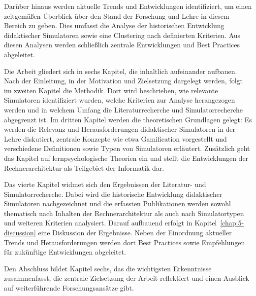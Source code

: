 Darüber hinaus werden aktuelle Trends und Entwicklungen identifiziert, um einen zeitgemäßen Überblick über den Stand der Forschung und Lehre in diesem Bereich zu geben. Dies umfasst die Analyse der historischen Entwicklung didaktischer Simulatoren sowie eine Clustering nach definierten Kriterien. Aus diesen Analysen werden schließlich zentrale Entwicklungen und Best Practices abgeleitet.

Die Arbeit gliedert sich in sechs Kapitel, die inhaltlich aufeinander aufbauen. Nach der Einleitung, in der Motivation und Zielsetzung dargelegt werden, folgt im zweiten Kapitel die Methodik. Dort wird beschrieben, wie relevante Simulatoren identifiziert wurden, welche Kriterien zur Analyse herangezogen werden und in welchem Umfang die Literaturrecherche und Simulatorrecherche abgegrenzt ist. Im dritten Kapitel werden die theoretischen Grundlagen gelegt: Es werden die Relevanz und Herausforderungen didaktischer Simulatoren in der Lehre diskutiert, zentrale Konzepte wie etwa Gamification vorgestellt und verschiedene Definitionen sowie Typen von Simulatoren erläutert. Zusätzlich geht das Kapitel auf lernpsychologische Theorien ein und stellt die Entwicklungen der Rechnerarchitektur als Teilgebiet der Informatik dar.

Das vierte Kapitel widmet sich den Ergebnissen der Literatur- und Simulatorrecherche. Dabei wird die historische Entwicklung didaktischer Simulatoren nachgezeichnet und die erfassten Publikationen werden sowohl thematisch nach Inhalten der Rechnerarchitektur als auch nach Simulatortypen und weiteren Kriterien analysiert. Darauf aufbauend erfolgt in Kapitel~\ref{chap:5-discussion} eine Diskussion der Ergebnisse. Neben der Einordnung aktueller Trends und Herausforderungen werden dort Best Practices sowie Empfehlungen für zukünftige Entwicklungen abgeleitet.

Den Abschluss bildet Kapitel sechs, das die wichtigsten Erkenntnisse zusammenfasst, die zentrale Zielsetzung der Arbeit reflektiert und einen Ausblick auf weiterführende Forschungsansätze gibt.
